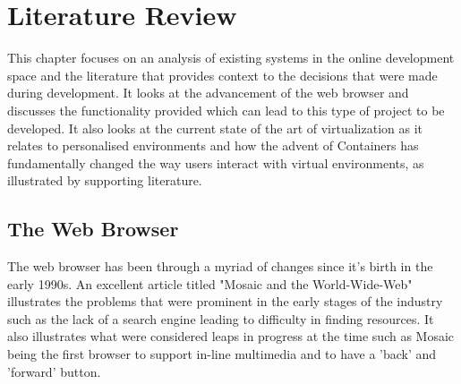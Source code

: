 
\chapter{Literature Review} \label{lit}

This chapter focuses on an analysis of existing systems in the online development space and the literature that provides context to the decisions that were made during development. It looks at the advancement of the web browser and discusses the functionality provided which can lead to this type of project to be developed. It also looks at the current state of the art of virtualization as it relates to personalised environments and how the advent of Containers has fundamentally changed the way users interact with virtual environments, as illustrated by supporting literature.

\section{The Web Browser} \label{lit-web}

The web browser has been through a myriad of changes since it's birth in the early 1990s. An excellent article titled "Mosaic and the World-Wide-Web"\cite{mosaic} illustrates the problems that were prominent in the early stages of the industry such as the lack of a search engine leading to difficulty in finding resources. It also illustrates what were considered leaps in progress at the time such as Mosaic being the first browser to support in-line multimedia and to have a 'back' and 'forward' button.

